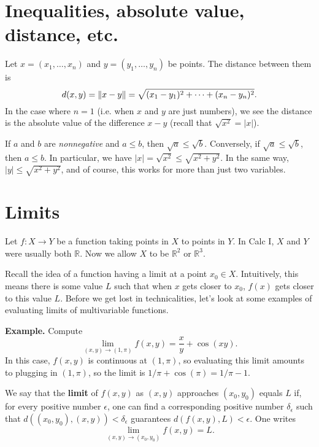 \documentclass{article}
\begin{document}


\section*{Inequalities, absolute value, distance, etc.}
Let $x=(x_1,\ldots,x_n)$ and $y=(y_1,\ldots,y_n)$ be points. The distance
between them is 
\[ d(x,y)=\norm{x-y}= \sqrt{(x_1-y_1)^2+\cdots+(x_n-y_n)^2} .\]
In the case where $n=1$ (i.e. when $x$ and $y$ are just numbers), we see
the distance is the absolute value of the difference $x-y$ (recall that $\sqrt{x^2}=|x|$).

If $a$ and $b$ are \emph{nonnegative} and $a\leq b$, then 
$\sqrt{a} \leq \sqrt{b}$. Conversely, if $\sqrt{a} \leq \sqrt{b}$, then $a\leq b$. In particular,
we have $|x|=\sqrt{x^2} \leq \sqrt{x^2 + y^2}$. In the same way, $|y| \leq \sqrt{x^2+y^2}$, and of course,
this works for more than just two variables.

\section*{Limits}
Let $f: X \to Y$ be a function taking points in $X$ to points in $Y$. In Calc I, $X$ and $Y$ were usually both $\mathbb{R}$. Now we allow $X$ to be $\mathbb{R}^2$ or $\mathbb{R}^3$.  

Recall the idea of a function having a limit at a point $x_0 \in X$. Intuitively, this means there is
some value $L$ such that when $x$ gets closer to $x_0$, $f(x)$ gets closer to this value $L$. Before we get lost 
in technicalities, let's look at some examples of evaluating limits of multivariable functions. 

\textbf{Example.} Compute 
\[\lim_{(x,y) \to (1,\pi)} f(x,y) = \frac{x}{y} + \cos(xy).\]
In this case, $f(x,y)$ is continuous at $(1,\pi)$, so evaluating this limit amounts to plugging in
$(1,\pi)$, so the limit is $1/\pi + \cos(\pi) = 1/\pi -1$.

\begin{definition}
    We say that the \textbf{limit} of $f(x,y)$ as $(x,y)$ approaches $(x_0,y_0)$ equals $L$ if, 
    for every positive number $\epsilon$, one can find a corresponding positive number $\delta_\epsilon$ such that
    $d((x_0,y_0),(x,y)) < \delta_\epsilon$ guarantees $d(f(x,y),L) < \epsilon$. One writes
    \[\lim_{(x,y)\to (x_0,y_0)} f(x,y) = L.\]
\end{definition}
\end{document}
